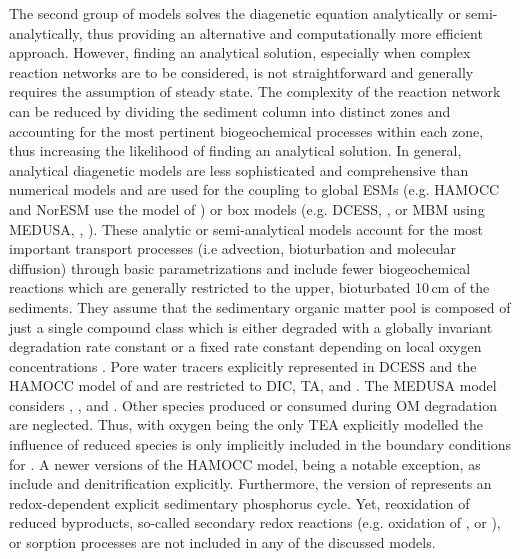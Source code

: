 \documentclass[gmd, manuscript]{copernicus}
\begin{document}
The second group of models solves the diagenetic equation analytically or semi-analytically, thus providing an alternative and computationally more efficient approach. 
However, finding an analytical solution, especially when complex reaction networks are to be considered, is not straightforward and generally requires the assumption of steady state. 
The complexity of the reaction network can be reduced by dividing the sediment column into distinct zones and accounting for the most pertinent biogeochemical processes 
within each zone, thus increasing the likelihood of finding an analytical solution. %
In general, analytical diagenetic models are less sophisticated and comprehensive than numerical models and are used for the coupling 
to global ESMs (e.g. HAMOCC and NorESM use the model of \citet{heinze_global_1999}) or box models (e.g. DCESS, \citeauthor{shaffer_presentation_2008}, \citeyear{shaffer_presentation_2008} or 
MBM using MEDUSA, \citeauthor{munhoven_glacialinterglacial_2007}, \citeyear{munhoven_glacialinterglacial_2007}). 
These analytic or semi-analytical models  account for the most important transport processes (i.e advection, bioturbation and molecular diffusion) through basic parametrizations and 
include fewer biogeochemical reactions which are generally restricted to the upper, bioturbated 10\,cm of the sediments. 
They assume that the sedimentary organic matter pool is composed of just a single compound class which is either degraded with a globally invariant degradation rate constant 
\citep[][]{munhoven_glacialinterglacial_2007} or a fixed rate constant depending on local oxygen concentrations \citep{shaffer_presentation_2008, palastanga_long_term_2011}. 
Pore water tracers explicitly represented in DCESS \citep{shaffer_presentation_2008} and the HAMOCC model of \citet{heinze_global_1999} and \citet{palastanga_long_term_2011} 
are restricted to DIC, TA,  and . The MEDUSA model \citep{munhoven_glacialinterglacial_2007} considers , ,  and . 
Other species produced or consumed during OM degradation are neglected. 
Thus, with oxygen being the only TEA explicitly modelled the influence of reduced species is only implicitly included in the boundary conditions for . 
A newer versions of the HAMOCC model, being a notable exception, as \citet{ilyina_global_2013} include  and denitrification explicitly. Furthermore, the version of 
\citet{palastanga_long_term_2011} represents an redox-dependent explicit sedimentary phosphorus cycle. 
Yet, reoxidation of reduced byproducts, so-called secondary redox reactions (e.g. oxidation of ,  or ), or sorption processes are not included in any of the discussed models. 
\end{document}
